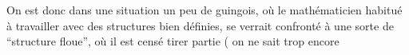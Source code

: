 On est donc dans une situation un peu de guingois, où le mathématicien habitué à travailler avec des structures bien définies, se verrait confronté à une \margin{\handwritten{\unsure{$\times$|*}}}sorte de ``structure floue'', où il est censé tirer partie ( on ne sait trop encore
